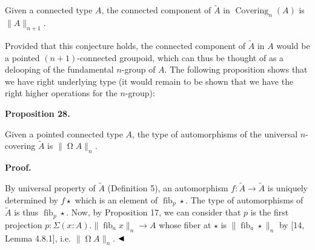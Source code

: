 \documentclass[10pt,a4paper]{article}
\begin{document}
 
Given a connected type $A$, the connected component of $\tilde{A}$ in $\operatorname{Covering}_{n}(A)$ is $\|A\|_{n+1}$.\par
 
 
 
 
Provided that this conjecture holds, the connected component of $\tilde{A}$ in $A$ would be a pointed $(n{+}1)$-connected groupoid, which can thus be thought of as a delooping of the fundamental $n$-group of $A$. The following proposition shows that we have right underlying type (it would remain to be shown that we have the right higher operations for the $n$-group):\par
 
 
 
\par\medskip\noindent\textbf{Proposition 28.}\par
 
 
Given a pointed connected type $A$, the type of automorphisms of the universal $n$-covering $\tilde{A}$ is $\|\operatorname{\Omega}A\|_{n}$.\par
 
 
 
 
 
\par\medskip\noindent\textbf{Proof.}\par
 
 
By universal property of $\tilde{A}$ (Definition 5), an automorphism $f:\tilde{A}\to\tilde{A}$ is uniquely determined by $f\star$ which is an element of $\operatorname{fib}_{p}\star$. The type of automorphisms of $\tilde{A}$ is thus $\operatorname{fib}_{p}\star$. Now, by Proposition 17, we can consider that $p$ is the first projection $p:\Sigma(x:A).\|\operatorname{fib}_{a}x\|_{n}\to A$ whose fiber at $\star$ is $\|\operatorname{fib}_{a}\star\|_{n}$ by [14, Lemma 4.8.1], i.e. $\|\operatorname{\Omega}A\|_{n}$. $\hfill\blacktriangleleft$\par
 
\end{document}
